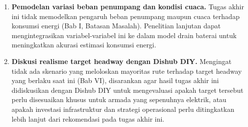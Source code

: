 \begin{enumerate}
	sebagai bagian dari cakupan inti, termasuk pemodelan kebijakan
	pengisian daya di \textit{pool} pada malam hari secara lebih rinci.
	\item \textbf{Pemodelan variasi beban penumpang dan kondisi cuaca.}
	Tugas akhir ini tidak memodelkan pengaruh beban penumpang maupun
	cuaca terhadap konsumsi energi (Bab I, Batasan Masalah). Penelitian
	lanjutan dapat mengintegrasikan variabel-variabel ini ke dalam model
	drain baterai untuk meningkatkan akurasi estimasi konsumsi energi.
	\item \textbf{Diskusi realisme target headway dengan Dishub DIY.}
	Mengingat tidak ada skenario yang meloloskan mayoritas rute terhadap
	target headway yang berlaku saat ini (Bab VI), disarankan agar hasil
	tugas akhir ini didiskusikan dengan Dishub DIY untuk mengevaluasi
	apakah target tersebut perlu disesuaikan khusus untuk armada yang
	sepenuhnya elektrik, atau apakah investasi infrastruktur dan strategi
	operasional perlu ditingkatkan lebih lanjut dari rekomendasi pada
	tugas akhir ini.
\end{enumerate}
